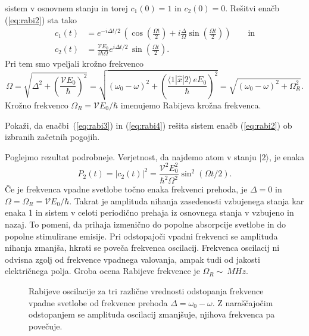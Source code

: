 sistem v osnovnem stanju in torej $c_1(0)=1$ in $c_2(0)=0$. Rešitvi enačb
(\ref{eq:rabi2}) sta tako
\begin{align}
c_1(t)&=e^{-i\Delta t/2}\, \left(\cos\left(\frac{\Omega t}{2}\right) + 
i \frac{\Delta}{\Omega} \sin\left(\frac{\Omega t}{2}\right) \right)\qquad \mathrm{in} 
\label{eq:rabi3} \\
c_2(t)&=\frac{\mathcal{V}E_0}{i\hbar \Omega} e^{i\Delta t/2}\, \sin\left(\frac{\Omega t}{2}\right).
\label{eq:rabi4}
\end{align}
Pri tem smo vpeljali krožno frekvenco
\begin{equation}
\Omega = \sqrt{\Delta^2 + \left(\frac{\mathcal{V}E_0}{\hbar}\right)^2} = \sqrt{(\omega_0-\omega)^2 
+ \left(\frac{\langle1|\hat{x}|2\rangle\, eE_0}{\hbar}\right)^2} = 
\sqrt{(\omega_0-\omega)^2 + \Omega_R^2}.
\end{equation}
Krožno frekvenco $\Omega_R = \mathcal{V} E_0/\hbar$ imenujemo Rabijeva krožna frekvenca.

\begin{definition}
Pokaži, da enačbi~(\ref{eq:rabi3}) in (\ref{eq:rabi4}) rešita
sistem enačb (\ref{eq:rabi2}) ob izbranih začetnih pogojih.
\end{definition}
Poglejmo rezultat podrobneje. Verjetnost, da najdemo atom v stanju $|2\rangle$, je enaka
\begin{equation}
P_2(t) = |c_2(t)|^2 = \frac{\mathcal{V}^2E_0^2}{\hbar^2 \Omega^2}\sin^2(\Omega t/2).
\end{equation}
Če je frekvenca vpadne svetlobe točno enaka frekvenci prehoda, je $\Delta = 0$ in 
$\Omega = \Omega_R = \mathcal{V}E_0/\hbar$. Takrat je amplituda nihanja zasedenosti vzbujenega stanja kar enaka 1
in sistem v celoti periodično prehaja iz osnovnega stanja v vzbujeno in nazaj. To pomeni,
da prihaja izmenično do popolne absorpcije svetlobe in do popolne stimulirane emisije.
Pri odstopajoči vpadni frekvenci se amplituda nihanja zmanjša, hkrati se poveča
frekvenca oscilacij. Frekvenca oscilacij ni odvisna zgolj od frekvence vpadnega valovanja, 
ampak tudi od jakosti električnega polja. Groba ocena
Rabijeve frekvence je $\Omega_R \sim~\si{MHz}$.
\begin{figure}[h]
\centering
\def\svgwidth{100truemm} 

\caption{Rabijeve oscilacije za tri različne vrednosti odstopanja frekvence vpadne
svetlobe od frekvence prehoda $\Delta=\omega_0-\omega$. 
Z naraščajočim odstopanjem se amplituda oscilacij
zmanjšuje, njihova frekvenca pa povečuje.}
\label{fig:Rabi}
\end{figure}

